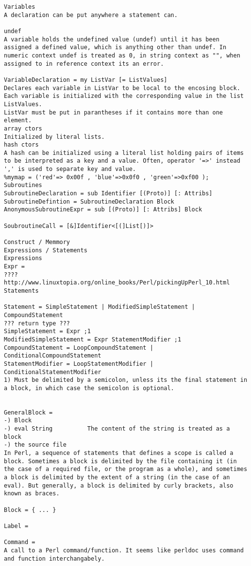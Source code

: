 \documentclass{article}
\begin{document}
\begin{description}
{\begin{verbatim}
Variables
A declaration can be put anywhere a statement can. 

undef
A variable holds the undefined value (undef) until it has been assigned a defined value, which is anything other than undef. In numeric context undef is treated as 0, in string context as "", when assigned to in reference context its an error.

VariableDeclaration = my ListVar [= ListValues]
Declares each variable in ListVar to be local to the encosing block. Each variable is initialized with the corresponding value in the list ListValues.
ListVar must be put in parantheses if it contains more than one element.
array ctors
Initialized by literal lists.
hash ctors
A hash can be initialized using a literal list holding pairs of items to be interpreted as a key and a value. Often, operator '=>' instead ',' is used to separate key and value.
%mymap = ('red'=> 0x00f , 'blue'=>0x0f0 , 'green'=>0xf00 );
Subroutines
SubroutineDeclaration = sub Identifier [(Proto)] [: Attribs]
SubroutineDefintion = SubroutineDeclaration Block
AnonymousSubroutineExpr = sub [(Proto)] [: Attribs] Block

SoubroutineCall = [&]Identifier<[(]List[)]>

Construct / Memmory
Expressions / Statements
Expressions
Expr = 
????
http://www.linuxtopia.org/online_books/Perl/pickingUpPerl_10.html
Statements

Statement = SimpleStatement | ModifiedSimpleStatement | CompoundStatement
??? return type ???
SimpleStatement = Expr ;1
ModifiedSimpleStatement = Expr StatementModifier ;1
CompoundStatement = LoopCompoundStatement | ConditionalCompoundStatement
StatementModifier = LoopStatementModifier | ConditionalStatementModifier
1) Must be delimited by a semicolon, unless its the final statement in a block, in which case the semicolon is optional.


GeneralBlock = 
-) Block
-) eval String			The content of the string is treated as a block 
-) the source file
In Perl, a sequence of statements that defines a scope is called a block. Sometimes a block is delimited by the file containing it (in the case of a required file, or the program as a whole), and sometimes a block is delimited by the extent of a string (in the case of an eval). But generally, a block is delimited by curly brackets, also known as braces. 

Block = { ... }

Label =

Command =
A call to a Perl command/function. It seems like perldoc uses command and function interchangabely.


\end{verbatim}}
\end{description}
\end{document}
